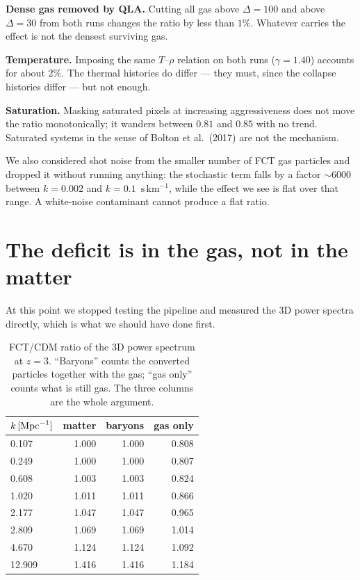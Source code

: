\documentclass[11pt,a4paper]{article}
\newcommand{\kv}{\ensuremath{\mathrm{s\,km^{-1}}}}
\begin{document}
\textbf{Dense gas removed by QLA.} Cutting all gas above $\Delta = 100$ and
above $\Delta = 30$ from both runs changes the ratio by less than $1\%$.
Whatever carries the effect is not the densest surviving gas.

\textbf{Temperature.} Imposing the same $T$--$\rho$ relation on both runs
($\gamma = 1.40$) accounts for about $2\%$. The thermal histories do differ
--- they must, since the collapse histories differ --- but not enough.

\textbf{Saturation.} Masking saturated pixels at increasing aggressiveness
does not move the ratio monotonically; it wanders between $0.81$ and $0.85$
with no trend. Saturated systems in the sense of Bolton et al.~(2017) are
not the mechanism.

We also considered shot noise from the smaller number of FCT gas particles
and dropped it without running anything: the stochastic term falls by a
factor $\sim 6000$ between $k=0.002$ and $k=0.1$~\kv{}, while the effect we
see is flat over that range. A white-noise contaminant cannot produce a
flat ratio.

\section{The deficit is in the gas, not in the matter}
\label{sec:3d}

At this point we stopped testing the pipeline and measured the 3D power
spectra directly, which is what we should have done first.

\begin{table}[h]
\centering
\begin{tabular}{lrrr}
\toprule
$k\,[{\rm Mpc}^{-1}]$ & matter & baryons & gas only \\
\midrule
0.107 & 1.000 & 1.000 & 0.808 \\
0.249 & 1.000 & 1.000 & 0.807 \\
0.608 & 1.003 & 1.003 & 0.824 \\
1.020 & 1.011 & 1.011 & 0.866 \\
2.177 & 1.047 & 1.047 & 0.965 \\
2.809 & 1.069 & 1.069 & 1.014 \\
4.670 & 1.124 & 1.124 & 1.092 \\
12.909 & 1.416 & 1.416 & 1.184 \\
\bottomrule
\end{tabular}
\caption{FCT/CDM ratio of the 3D power spectrum at $z=3$. ``Baryons''
counts the converted particles together with the gas; ``gas only'' counts
what is still gas. The three columns are the whole argument.}
\label{tab:3d}
\end{table}
\end{document}
